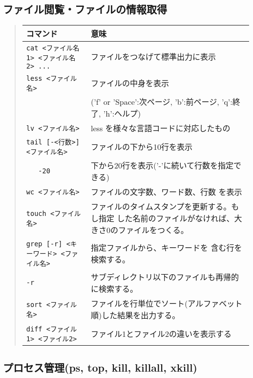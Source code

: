 \documentclass{jreport}
\begin{document}
\subsection{ファイル閲覧・ファイルの情報取得}

\begin{quote}
\begin{tabular}[t]{lp{9cm}}\hline
コマンド & 意味 \\ \hline
\verb|cat <ファイル名1> <ファイル名2> ...| & ファイルをつなげて標準出力に表示 \\
\verb|less <ファイル名>| & ファイルの中身を表示 \\
& ('f' or 'Space':次ページ, 'b':前ページ, 'q':終了, 'h':ヘルプ)\\
\verb|lv <ファイル名>| & less を様々な言語コードに対応したもの\\
\verb|tail [-<行数>]<ファイル名>| & ファイルの下から10行を表示\\
\verb|   -20| & 下から20行を表示('-'に続いて行数を指定できる)\\
\verb|wc <ファイル名>| & ファイルの文字数、ワード数、行数 を表示 \\
\verb|touch <ファイル名>| & ファイルのタイムスタンプを更新する。もし指定
した名前のファイルがなければ、大きさ0のファイルをつくる。\\
\verb|grep [-r] <キーワード> <ファイル名>| & 指定ファイルから、キーワードを
含む行を検索する。\\
\qquad\verb|-r| & サブディレクトリ以下のファイルも再帰的に検索する。\\
\verb|sort <ファイル名>| & ファイルを行単位でソート(アルファベット順)した結果を出力する。\\
\verb|diff <ファイル1> <ファイル2>| & ファイル1とファイル2の違いを表示する\\
\hline
\end{tabular}
\end{quote}



\subsection{プロセス管理(ps, top, kill, killall, xkill)\label{sec:process}}
\end{document}
